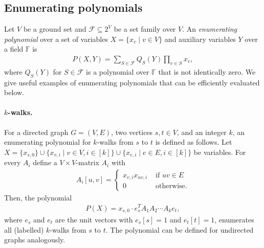 \documentclass{theoretics}
\newcommand{\F}{\ensuremath{\mathbb F}\xspace}
\newcommand{\cF}{\ensuremath{\mathcal F}\xspace}
\begin{document}
\subsection{Enumerating polynomials} \label{sec:enum-poly}

Let $V$ be a ground set and $\cF \subseteq 2^V$ be a set family over $V$.
An \emph{enumerating polynomial} over a set of variables $X = \{ x_v \mid v \in V \}$ and auxiliary variables $Y$ over a field $\F$ is
\begin{align*}
  P(X, Y) = \sum_{S \in \cF} Q_S(Y) \prod_{v \in S} x_v,
\end{align*}
where $Q_S(Y)$ for $S \in \cF$ is a polynomial over $\F$ that is not identically zero.
We give useful examples of enumerating polynomials that can be efficiently evaluated below.

\paragraph*{$k$-walks.}
For a directed graph $G = (V, E)$, two vertices $s, t \in V$, and an integer $k$, an enumerating polynomial for $k$-walks from $s$ to $t$ is defined as follows.
Let $X = \{ x_{s,0} \} \cup \{ x_{v,i} \mid v \in V, i \in [k] \} \cup \{ x_{e,i} \mid e \in E, i \in [k] \}$ be variables.
For every $A_i$ define a $V \times V$-matrix $A_i$ with
\begin{align*}
  A_i[u,v] = \begin{cases}
    x_{v,i} x_{uv,i} & \text{ if } uv \in E \\
    0 & \text{ otherwise.}
  \end{cases}
\end{align*}
Then, the polynomial
\begin{align*}
  P(X) = x_{s,0} \cdot e_s^T A_1 A_2 \cdots A_{k} e_t,
\end{align*}
where $e_s$ and $e_t$ are the unit vectors with $e_s[s] = 1$ and $e_t[t] = 1$, enumerates all (labelled) $k$-walks from $s$ to $t$.
The polynomial can be defined for undirected graphs analogously.
\end{document}

